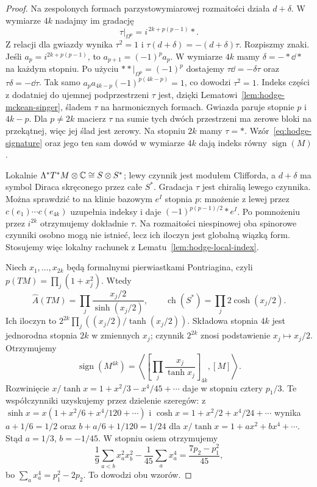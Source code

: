 \begin{proof}
Na zespolonych formach parzystowymiarowej
rozmaitości działa \(d+\delta\). W wymiarze
\(4k\) nadajmy im gradację
\[
 \tau|_{\Omega^p}=i^{\,2k+p(p-1)}*.
\]
Z relacji dla gwiazdy wynika
\(\tau^2=1\) i
\(\tau(d+\delta)=-(d+\delta)\tau\).
Rozpiszmy znaki. Jeśli $a_p=i^{2k+p(p-1)}$, to
$a_{p+1}=(-1)^p a_p$.
W wymiarze $4k$ mamy $\delta=-*\dd*$ na każdym stopniu.
Po użyciu $**|_{\Omega^p}=(-1)^p$ dostajemy
$\tau\dd=-\delta\tau$ oraz $\tau\delta=-\dd\tau$.
Tak samo $a_pa_{4k-p}(-1)^{p(4k-p)}=1$,
co dowodzi $\tau^2=1$.
Indeks części z dodatniej do ujemnej
podprzestrzeni \(\tau\) jest, dzięki
Lematowi~\ref{lem:hodge-mckean-singer},
śladem \(\tau\) na harmonicznych formach.
Gwiazda paruje stopnie \(p\) i \(4k-p\).
Dla $p\ne2k$ macierz $\tau$ na sumie tych dwóch przestrzeni
ma zerowe bloki na przekątnej, więc jej ślad jest zerowy.
Na stopniu \(2k\) mamy \(\tau=*\).
Wzór~\eqref{eq:hodge-signature} oraz jego
ten sam dowód w wymiarze \(4k\) dają
indeks równy \(\operatorname{sign}(M)\).

Lokalnie \(\Lambda^*T^*M\otimes\mathbb{C}
\cong S\otimes S^*\); lewy czynnik jest
modułem Clifforda, a \(d+\delta\) ma symbol
Diraca skręconego przez całe \(S^*\).
Gradacja \(\tau\) jest chiralią lewego
czynnika. Można sprawdzić to na klinie bazowym $e^I$ stopnia $p$:
mnożenie z lewej przez $c(e_1)\cdots c(e_{4k})$
uzupełnia indeksy i daje
$(-1)^{p(p-1)/2}*e^I$.
Po pomnożeniu przez $i^{2k}$ otrzymujemy dokładnie $\tau$.
Na rozmaitości niespinowej
oba spinorowe czynniki osobno mogą nie
istnieć, lecz ich iloczyn jest globalną
wiązką form. Stosujemy więc lokalny
rachunek z Lematu~\ref{lem:hodge-local-index}.

Niech \(x_1,\ldots,x_{2k}\) będą formalnymi
pierwiastkami Pontriagina, czyli
\(p(TM)=\prod_j(1+x_j^2)\). Wtedy
\[
 \widehat A(TM)=\prod_j
       \frac{x_j/2}{\sinh(x_j/2)},\qquad
 \operatorname{ch}(S^*)=
       \prod_j2\cosh(x_j/2).
\]
Ich iloczyn to
\(2^{2k}\prod_j((x_j/2)/\tanh(x_j/2))\).
Składowa stopnia \(4k\) jest jednorodna
stopnia \(2k\) w zmiennych \(x_j\);
czynnik \(2^{2k}\) znosi podstawienie
\(x_j\mapsto x_j/2\). Otrzymujemy
\[
 \operatorname{sign}(M^{4k})
  =\left\langle\left[
     \prod_j\frac{x_j}{\tanh x_j}
    \right]_{4k},[M]\right\rangle.
\]
Rozwinięcie
\(x/\tanh x=1+x^2/3-x^4/45+\cdots\)
daje w stopniu cztery \(p_1/3\).
Te współczynniki uzyskujemy przez dzielenie szeregów:
z $\sinh x=x(1+x^2/6+x^4/120+\cdots)$ i
$\cosh x=1+x^2/2+x^4/24+\cdots$ wynika
$a+1/6=1/2$ oraz $b+a/6+1/120=1/24$
dla $x/\tanh x=1+ax^2+bx^4+\cdots$.
Stąd $a=1/3$, $b=-1/45$.
W stopniu osiem otrzymujemy
\[
 \frac19\sum_{a<b}x_a^2x_b^2
 -\frac1{45}\sum_ax_a^4
 =\frac{7p_2-p_1^2}{45},
\]
bo \(\sum_ax_a^4=p_1^2-2p_2\).
To dowodzi obu wzorów.
\end{proof}

